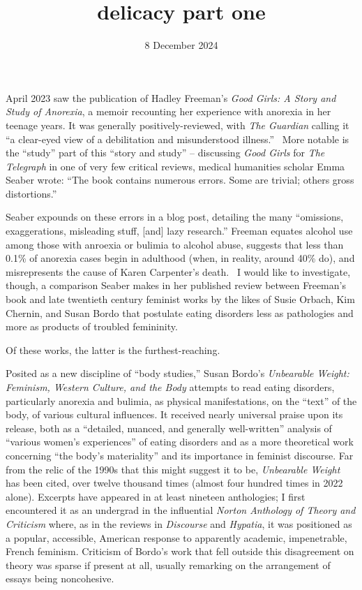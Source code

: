 \documentclass[11pt]{article}
\title{delicacy part one}
\date{8 December 2024}
\newcommand{\BExcerpt}{}
\newcommand{\EExcerpt}{}
\begin{document}
    \maketitle
    April 2023 saw the publication of Hadley Freeman's \textit{Good Girls: A Story and Study of Anorexia}, a memoir recounting her experience with anorexia in her teenage years. It was generally positively-reviewed, with \textit{The Guardian} calling it ``a clear-eyed view of a debilitation and misunderstood illness.''~ More notable is the ``study'' part of this ``story and study'' -- discussing \textit{Good Girls} for \textit{The Telegraph} in one of very few critical reviews, medical humanities scholar Emma Seaber wrote: ``The book contains numerous errors. Some are trivial; others gross distortions.''~ 

    Seaber expounds on these errors in a blog post, detailing the many ``omissions, exaggerations, misleading stuff, [and] lazy research.'' Freeman equates alcohol use among those with anroexia or bulimia to alcohol abuse, suggests that less than 0.1\% of anorexia cases begin in adulthood (when, in reality, around 40\% do), and misrepresents the cause of Karen Carpenter's death.~ I would like to investigate, though, a comparison Seaber makes in her published review between Freeman's book and late twentieth century feminist works by the likes of Susie Orbach, Kim Chernin, and Susan Bordo that postulate eating disorders less as pathologies and more as products of troubled femininity.

    Of these works, the latter is the furthest-reaching.
    \BExcerpt
    Posited as a new discipline of ``body studies,'' Susan Bordo's \textit{Unbearable Weight: Feminism, Western Culture, and the Body} attempts to read eating disorders, particularly anorexia and bulimia, as physical manifestations, on the ``text'' of the body, of various cultural influences. It received nearly universal praise upon its release, both as a ``detailed, nuanced, and generally well-written'' analysis of ``various women's experiences'' of eating disorders and as a more theoretical work concerning ``the body's materiality'' and its importance in feminist discourse. Far from the relic of the 1990s that this might suggest it to be, \textit{Unbearable Weight} has been cited, over twelve thousand times (almost four hundred times in 2022 alone). Excerpts have appeared in at least nineteen anthologies; I first encountered it as an undergrad in the influential \textit{Norton Anthology of Theory and Criticism} where, as in the reviews in \textit{Discourse} and \textit{Hypatia}, it was positioned as a popular, accessible, American response to apparently academic, impenetrable, French feminism. Criticism of Bordo's work that fell outside this disagreement on theory was sparse if present at all, usually remarking on the arrangement of essays being noncohesive.~\autocites[176]{Green94}[153]{Hekman95}
    \EExcerpt
    
\end{document}
